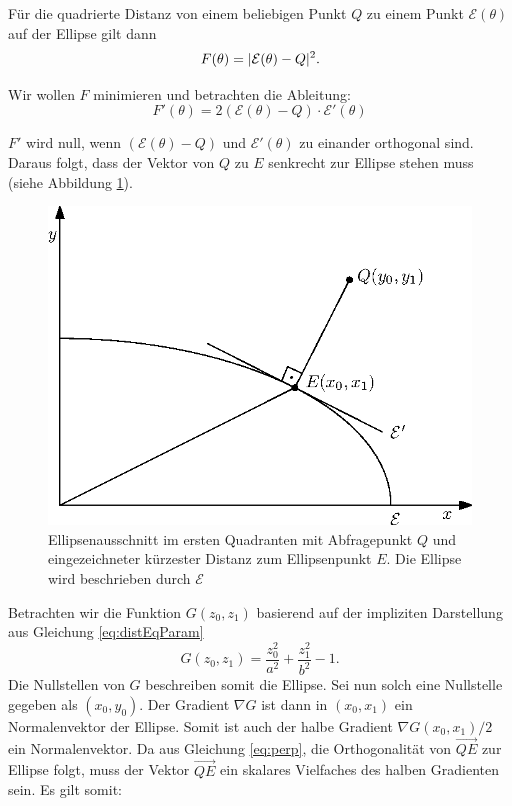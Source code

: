Für die quadrierte Distanz von einem beliebigen Punkt $Q$ zu einem Punkt $\mathcal{E}(\theta)$ auf der Ellipse gilt dann
\begin{equation}
	F(\theta) = \lvert\mathcal{E}(\theta) - Q\rvert^2.
\end{equation}

Wir wollen $F$ minimieren und betrachten die Ableitung:
\begin{equation}\label{eq:perp}
F'(\theta) = 2\left(\mathcal{E}(\theta) - Q\right) \cdot \mathcal{E}'(\theta)
\end{equation}

$F'$ wird null, wenn $\left(\mathcal{E}(\theta) - Q\right)$ und $ \mathcal{E}'(\theta)$ zu einander orthogonal sind. Daraus folgt, dass der Vektor von $Q$ zu $E$ senkrecht zur Ellipse stehen muss (siehe Abbildung \ref{fig:ellipseDist}). 


\begin{figure}[!htb]
	\centering
	\includegraphics[scale=.9]{images/ellipseQuery.eps}
	\caption{Ellipsenausschnitt im ersten Quadranten mit Abfragepunkt $Q$ und eingezeichneter kürzester Distanz zum Ellipsenpunkt $E$. Die Ellipse wird beschrieben durch $\mathcal{E}$}
	\label{fig:ellipseDist}
\end{figure}

Betrachten wir die Funktion $G(z_0,z_1)$ basierend auf der impliziten Darstellung aus Gleichung \ref{eq:distEqParam}
\begin{equation} \label{eq:ellipseDistEq}
	G(z_0,z_1) = \frac{z_0^2}{a^2} + \frac{z_1^2}{b^2} - 1.
\end{equation}
Die Nullstellen von $G$ beschreiben somit die Ellipse. Sei nun solch eine Nullstelle gegeben als $(x_0,y_0)$. Der Gradient $\nabla G$ ist dann in $(x_0,x_1)$ ein Normalenvektor der Ellipse. Somit ist auch der halbe Gradient $\nabla G(x_0,x_1)/2$ ein Normalenvektor. Da aus Gleichung \ref{eq:perp}, die Orthogonalität von $\overrightarrow{QE}$ zur Ellipse folgt,  muss der Vektor  $\overrightarrow{QE}$ ein skalares Vielfaches des halben Gradienten sein. Es gilt somit:

